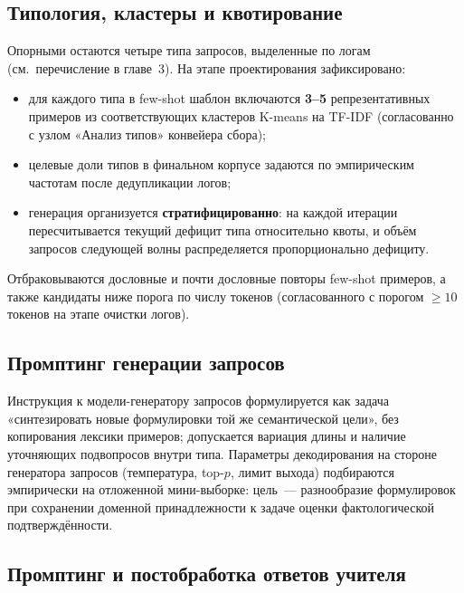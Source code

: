 \documentclass[times]{itmo-student-thesis}
\begin{document}
\subsection{Типология, кластеры и квотирование}

Опорными остаются четыре типа запросов, выделенные по логам
(см.~перечисление в главе~3). На этапе проектирования зафиксировано:
\begin{itemize}
    \item для каждого типа в few-shot шаблон включаются \textbf{3--5}
          репрезентативных примеров из соответствующих кластеров K-means
          на TF-IDF (согласованно с узлом «Анализ типов» конвейера сбора);
    \item целевые доли типов в финальном корпусе задаются по эмпирическим
          частотам после дедупликации логов;
    \item генерация организуется \textbf{стратифицированно}: на каждой
          итерации пересчитывается текущий дефицит типа относительно квоты,
          и объём запросов следующей волны распределяется пропорционально
          дефициту.
\end{itemize}
Отбраковываются дословные и почти дословные повторы few-shot примеров,
а также кандидаты ниже порога по числу токенов (согласованного с
порогом $\ge 10$ токенов на этапе очистки логов).

\subsection{Промптинг генерации запросов}

Инструкция к модели-генератору запросов формулируется как задача
«синтезировать новые формулировки той же семантической цели», без
копирования лексики примеров; допускается вариация длины и наличие
уточняющих подвопросов внутри типа. Параметры декодирования на стороне
генератора запросов (температура, top-$p$, лимит выхода) подбираются
эмпирически на отложенной мини-выборке: цель~--- разнообразие формулировок
при сохранении доменной принадлежности к задаче оценки фактологической
подтверждённости.

\subsection{Промптинг и постобработка ответов учителя}
\end{document}
